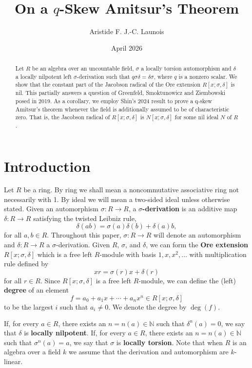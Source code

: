 \documentclass[12pt]{amsart}
\title{On a $q$-Skew Amitsur's Theorem}
\author{Aristide F. J.-C. Launois}
\date{April 2026}
\theoremstyle{definition}
\theoremstyle{definition}
\theoremstyle{definition}
\theoremstyle{remark}
\theoremstyle{definition}
\begin{document}


\begin{abstract}
    Let $R$ be an algebra over an uncountable field, $\sigma$ a locally torsion automorphism and $\delta$ a locally nilpotent left $\sigma$-derivation such that $q\sigma\delta = \delta\sigma$, where $q$ is a nonzero scalar. We show that the constant part of the Jacobson radical of the Ore extension $R[x;\sigma,\delta]$ is nil. This partially answers a question of Greenfeld, Smoktunowicz and Ziembowski posed in 2019. As a corollary, we employ Shin's 2024 result to prove a q-skew Amitsur's theorem whenever the field is additionally assumed to be of characteristic zero. That is, the Jacobson radical of $R[x;\sigma, \delta]$ is $N[x;\sigma,\delta]$ for some nil ideal $N$ of $R$. 
\end{abstract}

\maketitle

\section{Introduction}

Let $R$ be a ring. By ring we shall mean a noncommutative associative ring not necessarily with 1. By ideal we will mean a two-sided ideal unless otherwise stated. Given an automorphism $\sigma:R \to R$, a \textbf{$\sigma$-derivation} is an additive map $\delta:R\to R$ satisfying the twisted Leibniz rule,\[
        \delta(ab) = \sigma(a)\delta(b) + \delta(a)b,
    \]for all $a,b \in R$. Throughout this paper, $\sigma:R \to R$ will denote an automorphism and $\delta:R\to R$ a $\sigma$-derivation. Given $R$, $\sigma$, and $\delta$, we can form the \textbf{Ore extension} $R[x;\sigma, \delta]$ which is a free left $R$-module with basis $1,x,x^2,\dots$ with multiplication rule defined by \[
        xr = \sigma(r)x + \delta(r)
    \] for all $r \in R$. Since $R[x;\sigma,\delta]$ is a free left $R$-module, we can define the (left) \textbf{degree} of an element $$f = a_0+a_1x+\cdots +a_nx^n \in R[x;\sigma,\delta]$$ to be the largest $i$ such that $a_i \neq 0$. We denote the degree by $\deg(f)$.

If, for every $a \in R$, there exists an $n = n(a) \in \mathbb{N}$ such that $\delta^n(a) = 0$, we say that $\delta$ is \textbf{locally nilpotent}. If, for every $a \in R$, there exists an $n = n(a) \in \mathbb{N}$ such that $\sigma^n(a) = a$, we say that $\sigma$ is  \textbf{locally torsion}. Note that when $R$ is an algebra over a field $k$ we assume that the derivation and automorphism are $k$-linear.
\end{document}
